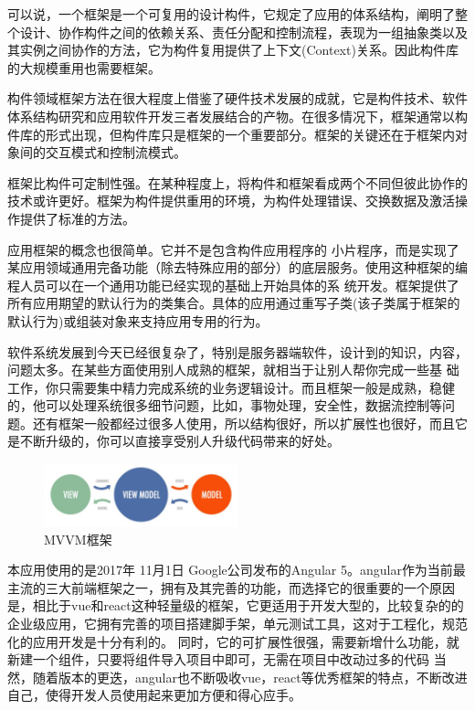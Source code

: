 可以说，一个框架是一个可复用的设计构件，它规定了应用的体系结构，阐明了整个设计、协作构件之间的依赖关系、责任分配和控制流程，表现为一组抽象类以及其实例之间协作的方法，它为构件复用提供了上下文(Context)关系。因此构件库的大规模重用也需要框架。
 
构件领域框架方法在很大程度上借鉴了硬件技术发展的成就，它是构件技术、软件体系结构研究和应用软件开发三者发展结合的产物。在很多情况下，框架通常以构件库的形式出现，但构件库只是框架的一个重要部分。框架的关键还在于框架内对象间的交互模式和控制流模式。

框架比构件可定制性强。在某种程度上，将构件和框架看成两个不同但彼此协作的技术或许更好。框架为构件提供重用的环境，为构件处理错误、交换数据及激活操作提供了标准的方法。 

应用框架的概念也很简单。它并不是包含构件应用程序的 小片程序，而是实现了某应用领域通用完备功能（除去特殊应用的部分）的底层服务。使用这种框架的编程人员可以在一个通用功能已经实现的基础上开始具体的系 统开发。框架提供了所有应用期望的默认行为的类集合。具体的应用通过重写子类(该子类属于框架的默认行为)或组装对象来支持应用专用的行为。 

软件系统发展到今天已经很复杂了，特别是服务器端软件，设计到的知识，内容，问题太多。在某些方面使用别人成熟的框架，就相当于让别人帮你完成一些基 础工作，你只需要集中精力完成系统的业务逻辑设计。而且框架一般是成熟，稳健的，他可以处理系统很多细节问题，比如，事物处理，安全性，数据流控制等问 题。还有框架一般都经过很多人使用，所以结构很好，所以扩展性也很好，而且它是不断升级的，你可以直接享受别人升级代码带来的好处。 

\begin{figure}[h]
	\centering
	\includegraphics[width=0.5\textwidth]{image/mvvm.png}
	\caption{MVVM框架}
	\label{fig:mvvm}
\end{figure}
本应用使用的是2017年 11月1日 Google公司发布的Angular 5。angular\cite{Angular}作为当前最主流的三大前端框架之一，拥有及其完善的功能，而选择它的很重要的一个原因是，相比于vue和react这种轻量级的框架，它更适用于开发大型的，比较复杂的的企业级应用，它拥有完善的项目搭建脚手架，单元测试工具，这对于工程化，规范化的应用开发是十分有利的。
同时，它的可扩展性很强，需要新增什么功能，就新建一个组件，只要将组件导入项目中即可，无需在项目中改动过多的代码
当然，随着版本的更迭，angular也不断吸收vue，react等优秀框架的特点，不断改进自己，使得开发人员使用起来更加方便和得心应手。

